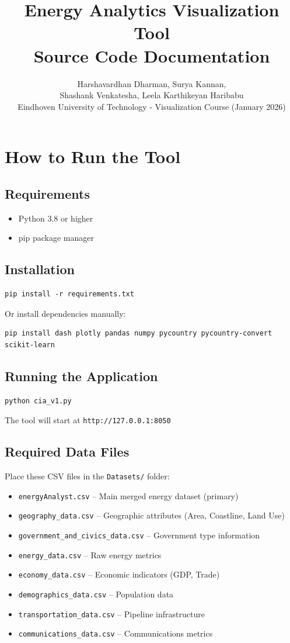 \documentclass[11pt]{article}
\title{Energy Analytics Visualization Tool\\[0.5em]\large Source Code Documentation}
\author{Harshavardhan Dharman, Surya Kannan,\\Shashank Venkatesha, Leela Karthikeyan Haribabu\\[0.5em]\small Eindhoven University of Technology - Visualization Course (January 2026)}
\date{}
\begin{document}
\maketitle

\section{How to Run the Tool}

\subsection{Requirements}
\begin{itemize}
    \item Python 3.8 or higher
    \item pip package manager
\end{itemize}

\subsection{Installation}
\begin{verbatim}
pip install -r requirements.txt
\end{verbatim}

Or install dependencies manually:
\begin{verbatim}
pip install dash plotly pandas numpy pycountry pycountry-convert scikit-learn
\end{verbatim}

\subsection{Running the Application}
\begin{verbatim}
python cia_v1.py
\end{verbatim}

The tool will start at \texttt{http://127.0.0.1:8050}

\subsection{Required Data Files}
Place these CSV files in the \texttt{Datasets/} folder:
\begin{itemize}
    \item \texttt{energyAnalyst.csv} -- Main merged energy dataset (primary)
    \item \texttt{geography\_data.csv} -- Geographic attributes (Area, Coastline, Land Use)
    \item \texttt{government\_and\_civics\_data.csv} -- Government type information
    \item \texttt{energy\_data.csv} -- Raw energy metrics
    \item \texttt{economy\_data.csv} -- Economic indicators (GDP, Trade)
    \item \texttt{demographics\_data.csv} -- Population data
    \item \texttt{transportation\_data.csv} -- Pipeline infrastructure
    \item \texttt{communications\_data.csv} -- Communications metrics
\end{itemize}
\end{document}
